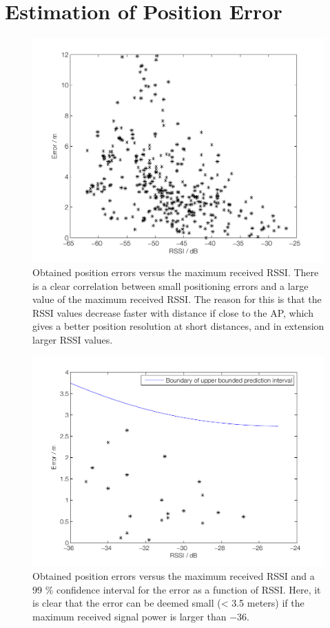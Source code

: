 \documentclass{LTHthesis}
\begin{document}
\section{Estimation of Position Error} %
%
\begin{figure}[!hbt]

\includegraphics[width=1\textwidth ]{images/adapt_parameters/error_vs_maxP_all}
\caption{Obtained position errors versus the maximum received RSSI. There is a clear correlation between small positioning errors and a large value of the maximum received RSSI. The reason for this is that the RSSI values decrease faster with distance if close to the AP, which gives a better position resolution at short distances, and in extension larger RSSI values.}\label{error_vs_maxp_all}
\end{figure}
%
\begin{figure}[!hbt]

\includegraphics[width=1\textwidth ]{images/adapt_parameters/prediction_interval}
\caption{Obtained position errors versus the maximum received RSSI and a 99 \% confidence interval for the error as a function of RSSI. Here, it is clear that the error can be deemed small (< 3.5 meters) if the maximum received signal power is larger than $-36$.}\label{prediction_interval}
\end{figure}
\end{document}
